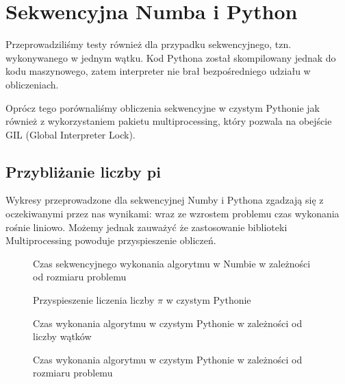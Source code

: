 \section{Sekwencyjna Numba i Python}
Przeprowadziliśmy testy również dla przypadku sekwencyjnego, tzn. wykonywanego w jednym wątku.
Kod Pythona został skompilowany jednak do kodu maszynowego, zatem interpreter nie brał bezpośredniego udziału w obliczeniach.

Oprócz tego porównaliśmy obliczenia sekwencyjne w czystym Pythonie jak również z wykorzystaniem pakietu multiprocessing,
który pozwala na obejście GIL (Global Interpreter Lock).

\subsection{Przybliżanie liczby pi}
Wykresy przeprowadzone dla sekwencyjnej Numby i Pythona zgadzają się z oczekiwanymi przez nas wynikami: wraz ze wzrostem problemu czas wykonania rośnie liniowo.
Możemy jednak zauważyć że zastosowanie biblioteki Multiprocessing powoduje przyspieszenie obliczeń.

\begin{figure*}
        \centering
        
        \caption{Czas sekwencyjnego wykonania algorytmu w Numbie w zależności od rozmiaru problemu}
        \label{fig:numba-seq-sizes}
    \end{figure*}

    \begin{figure*}
        \centering
        \begin{minipage}[b]{.45\textwidth}
            \centering
            
            \caption{Przyspieszenie liczenia liczby $\pi$ w czystym Pythonie}
            \label{fig:python-speedup}
        \end{minipage}
        \hfill
        \begin{minipage}[b]{.45\textwidth}
            \centering
            
            \caption{Czas wykonania algorytmu w czystym Pythonie w zależności od liczby wątków}
            \label{fig:python-threads}
        \end{minipage}
    \end{figure*}

    \begin{figure*}
        \centering
        
        \caption{Czas wykonania algorytmu w czystym Pythonie w zależności od rozmiaru problemu}
        \label{fig:python-sizes}
    \end{figure*}


